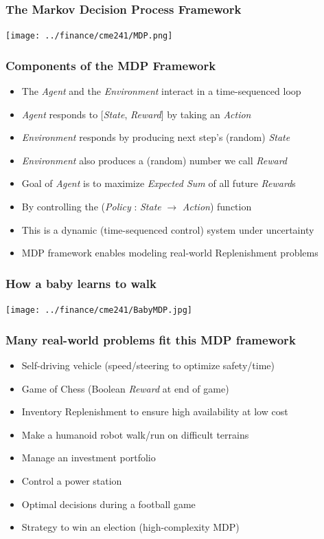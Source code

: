 \documentclass[handout]{beamer}
\begin{document}
\begin{frame}
\frametitle{The Markov Decision Process Framework}
\texttt{[image: ../finance/cme241/MDP.png]}
\end{frame}

\begin{frame}
\frametitle{Components of the MDP Framework}
\pause
\begin{itemize}[<+->]
\item The {\em Agent} and the {\em Environment} interact in a time-sequenced loop
\item {\em Agent} responds to [{\em State}, {\em Reward}] by taking an {\em Action}
\item {\em Environment} responds by producing next step's (random) {\em State}
\item {\em Environment} also produces a (random) number we call {\em Reward}
\item Goal of {\em Agent} is to maximize {\em Expected Sum} of all future {\em Reward}s
\item By controlling the ({\em Policy} : {\em State} $\rightarrow$ {\em Action}) function
\item This is a dynamic (time-sequenced control) system under uncertainty
\item MDP framework enables modeling real-world Replenishment problems
\end{itemize}
\end{frame}

\begin{frame}
\frametitle{How a baby learns to walk}
\texttt{[image: ../finance/cme241/BabyMDP.jpg]}
\end{frame}

\begin{frame}
\frametitle{Many real-world problems fit this MDP framework}
\pause
\begin{itemize}[<+->]
\item Self-driving vehicle (speed/steering to optimize safety/time)
\item Game of Chess (Boolean {\em Reward} at end of game)
\item Inventory Replenishment to ensure high availability at low cost
\item Make a humanoid robot walk/run on difficult terrains
\item Manage an investment portfolio
\item Control a power station
\item Optimal decisions during a football game
\item Strategy to win an election (high-complexity MDP)
\end{itemize}
\end{frame}
\end{document}
